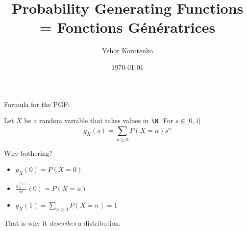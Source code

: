 \documentclass[12pt]{article}
\title{Probability Generating Functions = Fonctions Génératrices}
\author{Yehor Korotenko}
\date{\today}
\begin{document}
\maketitle

Formula for the PGF:

Let $X$ be a random variable that takes values in  $\N$. For $s \in [0, 1[$ 
$$g_X(s) = \sum_{n \ge 0}^{} P(X = n)s^n$$

Why bothering?

\begin{itemize}
    \item $g_X(0) = P(X = 0)$
    \item $\frac{g_X^{(n)}}{n!}(0) = P(X = n)$
    \item $g_X(1) = \sum_{n \ge 0}^{} P(X = n) = 1$
\end{itemize}

That is why it \textit{describes} a distribution.
\end{document}
